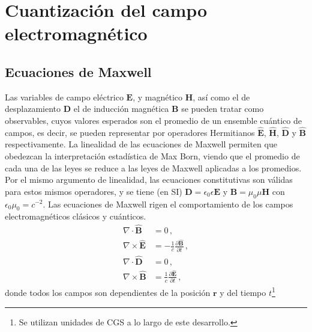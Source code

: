 \chapter{Cuantizaci\'on del campo electromagn\'etico}

\section{Ecuaciones de Maxwell}

Las variables de campo eléctrico $\mathbf{E}$, y magnético $\mathbf{H}$, así como el de desplazamiento $\mathbf{D}$ el de inducción magnética $\mathbf{B}$ se pueden tratar como observables, cuyos valores esperados son el promedio de un ensemble cuántico de campos, es decir, se pueden representar por operadores Hermitianos $\hat{\mathbf{E}}$, $\hat{\mathbf{H}}$, $\hat{\mathbf{D}}$ y $\hat{\mathbf{B}}$ respectivamente. La linealidad de las ecuaciones de Maxwell permiten que obedezcan la interpretación estadística de Max Born, viendo que el promedio de cada una de las leyes se reduce a las leyes de Maxwell aplicadas a los promedios. Por el mismo argumento de linealidad, las ecuaciones constitutivas son válidas para estos mismos operadores, y se tiene (en SI) $\mathbf{D} = \epsilon_0 \epsilon \mathbf{E}$ y $\mathbf{B} = \mu_0 \mu \mathbf{H}$ con $\epsilon_0 \mu_0 = c^{-2}$.
Las ecuaciones de Maxwell rigen el comportamiento de los campos electromagnéticos clásicos y cuánticos.
\begin{align}
  \nabla \cdot \hat{\mathbf{B}}  & = 0 \,,                                              \label{EM.1}                 \\
  \nabla \times \hat{\mathbf{E}} & = - \frac{1}{c} \frac{\partial \hat{\mathbf{B}}}{\partial t}\,,      \label{EM.2} \\
  \nabla \cdot \hat{\mathbf{D}}  & = 0 \,,                                        \label{EM.3}                       \\
  \nabla \times \hat{\mathbf{B}} & = \frac{1}{c}
  \frac{\partial \hat{\mathbf{E}}}{\partial t}\,, \label{EM.4}
\end{align}
donde todos los campos son dependientes de la posición $\mathbf{r}$ y del tiempo $t$\footnote{Se utilizan unidades de CGS a lo largo de este desarrollo.}

